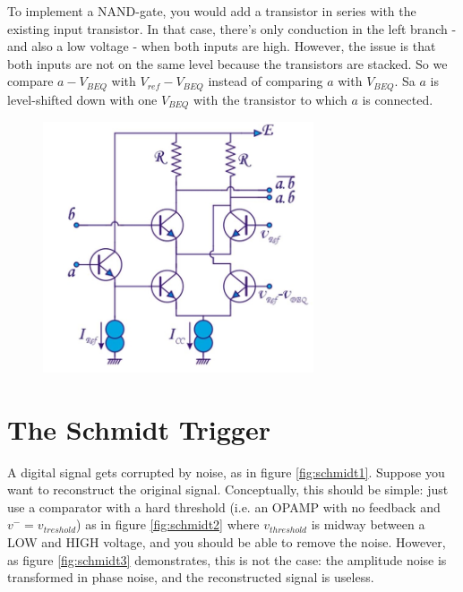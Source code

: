 To implement a NAND-gate, you would add a transistor in series with the existing input transistor. In that case, there's only conduction in the left branch - and also a low voltage - when both inputs are high. However, the issue is that both inputs are not on the same level because the transistors are stacked. So we compare $a - V_{BEQ}$ with $V_{ref} - V_{BEQ}$ instead of comparing $a$ with $V_{BEQ}$. Sa $a$ is level-shifted down with one $V_{BEQ}$ with the transistor to which $a$ is connected.

\begin{figure}[h!]
	\centering
	\includegraphics[width=8cm]{figures/ch15/ecl3.jpg}
	\caption{}
	\label{fig:ecl3}
\end{figure}


\section{The Schmidt Trigger}
\label{sec:schmidt}
A digital signal gets corrupted by noise, as in figure \ref{fig:schmidt1}. Suppose you want to reconstruct the original signal. Conceptually, this should be simple: just use a comparator with a hard threshold (i.e. an OPAMP with no feedback and $v^- = v_{treshold}$) as in figure \ref{fig:schmidt2} where $v_{threshold}$ is midway between a LOW and HIGH voltage, and you should be able to remove the noise. However, as figure \ref{fig:schmidt3} demonstrates, this is not the case: the amplitude noise is transformed in phase noise, and the reconstructed signal is useless.


